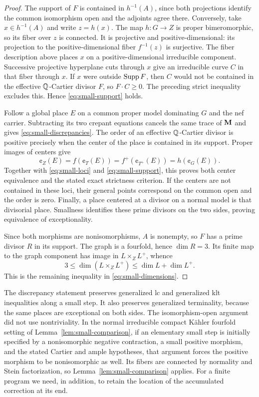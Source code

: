 \begin{proof}
The support of $F$ is contained in $h^{-1}(A)$, since both projections
identify the common isomorphism open and the adjoints agree there.
Conversely, take $x\in h^{-1}(A)$ and write $z=h(x)$.  The map
$h:G\to Z$ is proper bimeromorphic, so its fiber over $z$ is connected.
It is projective and positive-dimensional: its projection to the
positive-dimensional fiber $f^{-1}(z)$ is surjective.  The fiber
description above places $x$ on a positive-dimensional irreducible
component.  Successive projective hyperplane cuts through $x$ give an
irreducible curve $C$ in that fiber through $x$.  If $x$ were outside
$\operatorname{Supp} F$, then $C$ would not be contained in the effective
$\mathbb{Q}$-Cartier divisor $F$, so $F\cdot C\geq0$.  The preceding strict
inequality excludes this.  Hence \eqref{eq:small-support} holds.

Follow a global place $E$ on a common proper model dominating $G$ and
the nef carrier.  Subtracting its two crepant equations cancels the
same trace of $\mathbf{M}$ and gives \eqref{eq:small-discrepancies}.  The order
of an effective $\mathbb{Q}$-Cartier divisor is positive precisely when the
center of the place is contained in its support.  Proper images of
centers give
\[
 \cent_Z(E)=f(\cent_T(E))=f^+(\cent_{T^+}(E))=h(\cent_G(E)).
\]
Together with \eqref{eq:small-loci} and \eqref{eq:small-support}, this
proves both center equivalence and the stated exact strictness
criterion.  If the centers are not contained in these loci, their
general points correspond on the common open and the order is zero.
Finally, a place centered at a divisor on a normal model is that
divisorial place.  Smallness identifies these prime divisors on the
two sides, proving equivalence of exceptionality.

Since both morphisms are nonisomorphisms, $A$ is nonempty, so $F$ has
a prime divisor $R$ in its support.  The graph is a fourfold, hence
$\dim R=3$.  Its finite map to the graph component has image in
$L\times_ZL^+$, whence
\[
 3\leq\dim(L\times_ZL^+)\leq\dim L+\dim L^+.
\]
This is the remaining inequality in \eqref{eq:small-dimensions}.
\end{proof}

The discrepancy statement preserves generalized lc and generalized
klt inequalities along a small step.  It also preserves generalized
terminality, because the same places are exceptional on both sides.
The isomorphism-open argument did not use nontriviality.  In the normal
irreducible compact K\"ahler fourfold setting of
Lemma~\ref{lem:small-comparison}, if an elementary small step is initially specified by a nonisomorphic
negative contraction, a small positive morphism, and the stated Cartier
and ample hypotheses, that argument forces the positive morphism to be
nonisomorphic as well.  Its fibers are connected by normality and Stein
factorization, so Lemma~\ref{lem:small-comparison} applies.
For a finite program we need, in addition, to retain the location of
the accumulated correction at its end.


